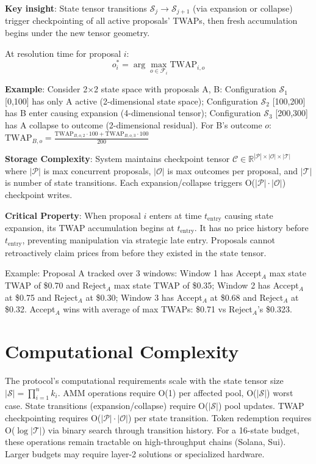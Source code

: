 \documentclass{article}
\begin{document}
        \textbf{Key insight}: State tensor transitions $\mathcal{S}_j \to \mathcal{S}_{j+1}$ (via expansion or collapse) trigger checkpointing of all active proposals' TWAPs, then fresh accumulation begins under the new tensor geometry.
        
        At resolution time for proposal $i$:
        \begin{equation}
        o_i^* = \arg\max_{o \in \mathcal{F}_i} \text{TWAP}_{i,o}
        \end{equation}
        
        \textbf{Example}: Consider 2×2 state space with proposals A, B: Configuration $\mathcal{S}_1$ [0,100] has only A active (2-dimensional state space); Configuration $\mathcal{S}_2$ [100,200] has B enter causing expansion (4-dimensional tensor); Configuration $\mathcal{S}_3$ [200,300] has A collapse to outcome (2-dimensional residual). For B's outcome $o$: $\text{TWAP}_{B,o} = \frac{\text{TWAP}_{B,o,2} \cdot 100 + \text{TWAP}_{B,o,3} \cdot 100}{200}$
        
        \textbf{Storage Complexity}: System maintains checkpoint tensor $\mathcal{C} \in \mathbb{R}^{|\mathcal{P}| \times |\mathcal{O}| \times |\mathcal{T}|}$ where $|\mathcal{P}|$ is max concurrent proposals, $|\mathcal{O}|$ is max outcomes per proposal, and $|\mathcal{T}|$ is number of state transitions. Each expansion/collapse triggers O($|\mathcal{P}| \cdot |\mathcal{O}|$) checkpoint writes.
        
        \textbf{Critical Property}: When proposal $i$ enters at time $t_{\text{entry}}$ causing state expansion, its TWAP accumulation begins at $t_{\text{entry}}$. It has no price history before $t_{\text{entry}}$, preventing manipulation via strategic late entry. Proposals cannot retroactively claim prices from before they existed in the state tensor.
        
        Example: Proposal A tracked over 3 windows: Window 1 has Accept$_A$ max state TWAP of \$0.70 and Reject$_A$ max state TWAP of \$0.35; Window 2 has Accept$_A$ at \$0.75 and Reject$_A$ at \$0.30; Window 3 has Accept$_A$ at \$0.68 and Reject$_A$ at \$0.32. Accept$_A$ wins with average of max TWAPs: \$0.71 vs Reject$_A$'s \$0.323.
        
\section{Computational Complexity}
The protocol's computational requirements scale with the state tensor size $|\mathcal{S}| = \prod_{i=1}^{n} k_i$. AMM operations require O(1) per affected pool, O($|\mathcal{S}|$) worst case. State transitions (expansion/collapse) require O($|\mathcal{S}|$) pool updates. TWAP checkpointing requires O($|\mathcal{P}| \cdot |\mathcal{O}|$) per state transition. Token redemption requires O($\log |\mathcal{T}|$) via binary search through transition history.
For a 16-state budget, these operations remain tractable on high-throughput chains (Solana, Sui). Larger budgets may require layer-2 solutions or specialized hardware.
\end{document}
